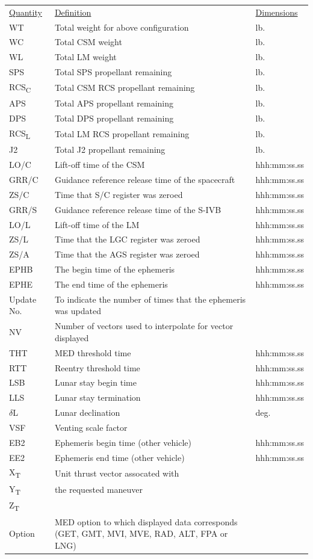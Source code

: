 \documentclass[11pt]{article} %
\begin{document}
\begin{center}
\begin{tabular} { L{2cm} L{8cm} L{6cm} }
\underline{Quantity}&\underline{Definition}&\underline{Dimensions}\\
WT&Total weight for above configuration&lb.\\
WC&Total CSM weight&lb.\\
WL&Total LM weight&lb.\\
SPS&Total SPS propellant remaining&lb.\\
RCS\textsubscript{C}&Total CSM RCS propellant remaining&lb.\\
APS&Total APS propellant remaining&lb.\\
DPS&Total DPS propellant remaining&lb.\\
RCS\textsubscript{L}&Total LM RCS propellant remaining&lb.\\
J2&Total J2 propellant remaining&lb.\\
LO/C&Lift-off time of the CSM&hhh:mm:ss.ss\\
GRR/C&Guidance reference release time of the spacecraft&hhh:mm:ss.ss\\
ZS/C&Time that S/C register was zeroed&hhh:mm:ss.ss\\
GRR/S&Guidance reference release time of the S-IVB&hhh:mm:ss.ss\\
LO/L&Lift-off time of the LM&hhh:mm:ss.ss\\
ZS/L&Time that the LGC register was zeroed&hhh:mm:ss.ss\\
ZS/A&Time that the AGS register was zeroed&hhh:mm:ss.ss\\
EPHB&The begin time of the ephemeris&hhh:mm:ss.ss\\
EPHE&The end time of the ephemeris&hhh:mm:ss.ss\\
Update No.&To indicate the number of times that the ephemeris was updated&\\
NV&Number of vectors used to interpolate for vector displayed&\\
THT&MED threshold time&hhh:mm:ss.ss\\
RTT&Reentry threshold time&hhh:mm:ss.ss\\
LSB&Lunar stay begin time&hhh:mm:ss.ss\\
LLS&Lunar stay termination&hhh:mm:ss.ss\\
$\delta$L&Lunar declination&deg.\\
VSF&Venting scale factor&\\
EB2&Ephemeris begin time (other vehicle)&hhh:mm:ss.ss\\
EE2&Ephemeris end time (other vehicle)&hhh:mm:ss.ss\\
X\textsubscript{T}&Unit thrust vector assocated with&\\
Y\textsubscript{T}&the requested maneuver&\\
Z\textsubscript{T}& &\\
Option&MED option to which displayed data corresponds (GET, GMT, MVI, MVE, RAD, ALT, FPA or LNG)&\\
\end{tabular}
\end{center}
\newpage
\end{document}
